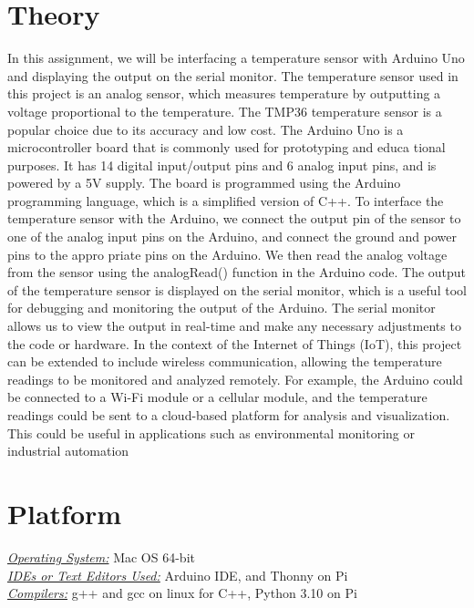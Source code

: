 \documentclass{article}
\begin{document}
\section{\textbf{Theory}}
In this assignment, we will be interfacing a temperature sensor with Arduino Uno and displaying
the output on the serial monitor. The temperature sensor used in this project is an analog sensor, which measures temperature by outputting a voltage proportional to the temperature. The TMP36 temperature sensor is a popular choice due to its accuracy and low cost.
The Arduino Uno is a microcontroller board that is commonly used for prototyping and educa
tional purposes. It has 14 digital input/output pins and 6 analog input pins, and is powered by a 5V supply. The board is programmed using the Arduino programming language, which is a simplified version of C++.
To interface the temperature sensor with the Arduino, we connect the output pin of the sensor to one of the analog input pins on the Arduino, and connect the ground and power pins to the appro priate pins on the Arduino. We then read the analog voltage from the sensor using the analogRead() function in the Arduino code.
The output of the temperature sensor is displayed on the serial monitor, which is a useful tool
for debugging and monitoring the output of the Arduino. The serial monitor allows us to view the output in real-time and make any necessary adjustments to the code or hardware.
In the context of the Internet of Things (IoT), this project can be extended to include wireless
communication, allowing the temperature readings to be monitored and analyzed remotely. For example, the Arduino could be connected to a Wi-Fi module or a cellular module, and the temperature readings could be sent to a cloud-based platform for analysis and visualization. This could be useful in applications such as environmental monitoring or industrial automation
\section{\textbf{Platform}}
\textit{\underline{Operating System:}} Mac OS 64-bit\\
\textit{\underline{IDEs or Text Editors Used:}} Arduino IDE, and Thonny on Pi\\ 
\textit{\underline{Compilers:}} g++ and gcc on linux for C++, Python 3.10 on Pi
\end{document}
